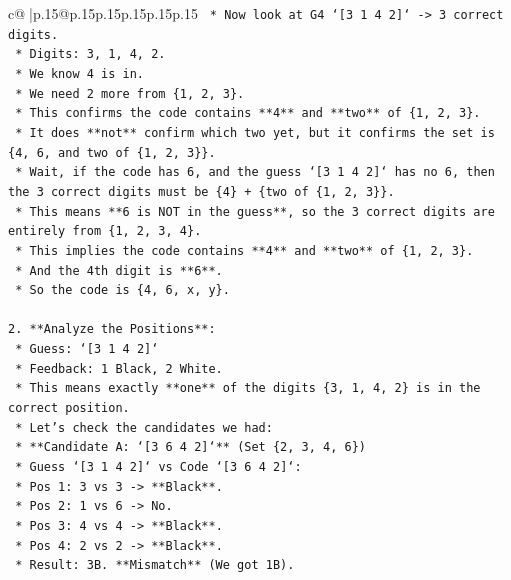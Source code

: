 \documentclass{article}
\begin{document}
{\begin{supertabular}{c@{$\;$}|p{.15\linewidth}@{}p{.15\linewidth}p{.15\linewidth}p{.15\linewidth}p{.15\linewidth}p{.15\linewidth}}
{{{\texttt{    *   Now look at G4 `{[}3 1 4 2{]}` {-}> 3 correct digits.} \\
\texttt{        *   Digits: 3, 1, 4, 2.} \\
\texttt{        *   We know 4 is in.} \\
\texttt{        *   We need 2 more from \{1, 2, 3\}.} \\
\texttt{        *   This confirms the code contains **4** and **two** of \{1, 2, 3\}.} \\
\texttt{        *   It does **not** confirm which two yet, but it confirms the set is \{4, 6, and two of \{1, 2, 3\}\}.} \\
\texttt{        *   Wait, if the code has 6, and the guess `{[}3 1 4 2{]}` has no 6, then the 3 correct digits must be \{4\} + \{two of \{1, 2, 3\}\}.} \\
\texttt{        *   This means **6 is NOT in the guess**, so the 3 correct digits are entirely from \{1, 2, 3, 4\}.} \\
\texttt{        *   This implies the code contains **4** and **two** of \{1, 2, 3\}.} \\
\texttt{        *   And the 4th digit is **6**.} \\
\texttt{        *   So the code is \{4, 6, x, y\}.} \\
\\ 
\texttt{2.  **Analyze the Positions**:} \\
\texttt{    *   Guess: `{[}3 1 4 2{]}`} \\
\texttt{    *   Feedback: 1 Black, 2 White.} \\
\texttt{    *   This means exactly **one** of the digits \{3, 1, 4, 2\} is in the correct position.} \\
\texttt{    *   Let's check the candidates we had:} \\
\texttt{        *   **Candidate A: `{[}3 6 4 2{]}`** (Set \{2, 3, 4, 6\})} \\
\texttt{            *   Guess `{[}3 1 4 2{]}` vs Code `{[}3 6 4 2{]}`:} \\
\texttt{                *   Pos 1: 3 vs 3 {-}> **Black**.} \\
\texttt{                *   Pos 2: 1 vs 6 {-}> No.} \\
\texttt{                *   Pos 3: 4 vs 4 {-}> **Black**.} \\
\texttt{                *   Pos 4: 2 vs 2 {-}> **Black**.} \\
\texttt{                *   Result: 3B. **Mismatch** (We got 1B).} \\
}}}
\end{supertabular}}
\end{document}
